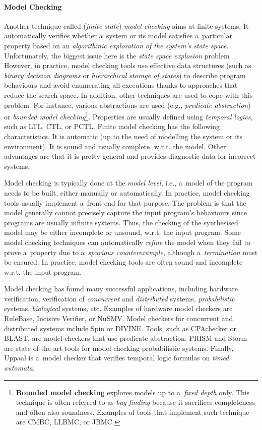 \paragraph{Model Checking}
Another technique called (\emph{finite-state}) \emph{model checking} aims at finite systems. It automatically verifies  whether a~system or its model satisfies a~particular property based on an \emph{algorithmic exploration of the system's state space}. Unfortunately, the biggest issue here is the \emph{state space explosion} problem~\cite{stateExpl}. However, in practice, model checking tools use effective data structures (such as \emph{binary decision diagrams} or \emph{hierarchical storage of states}) to describe program behaviours and avoid enumerating all executions thanks to approaches that reduce the search space. In addition, other techniques are used to cope with this problem. For instance, various abstractions are used (e.g., \emph{predicate abstraction}) or \emph{bounded model checking}\footnote{\textbf{Bounded model checking} explores models up to a~\emph{fixed depth} only. This technique is often referred to as \emph{bug finding} because it sacrifices completeness and often also soundness. Examples of tools that implement such technique are CMBC, LLBMC, or JBMC.}. Properties are usually defined using \emph{temporal logics}, such as LTL, CTL, or PCTL. Finite model checking has the following characteristics. It is automatic (up to the need of modelling the system or its environment). It is sound and usually complete, w.r.t. the model. Other advantages are that it is pretty general and provides diagnostic data for incorrect systems.

Model checking is typically done at the \emph{model level}, i.e., a~model of the program needs to be built, either manually or automatically. In practice, model checking tools usually implement a~front-end for that purpose. The problem is that the model generally cannot precisely capture the input program's behaviours since programs are usually infinite systems. Thus, the checking of the synthesised model may be either incomplete or unsound, w.r.t. the input program. Some model checking techniques can automatically \emph{refine} the model when they fail to prove a~property due to a~\emph{spurious counterexample}, although a~\emph{termination} must be ensured. In practice, model checking tools are often sound and incomplete w.r.t. the input program.

Model checking has found many successful applications, including hardware verification, verification of \emph{concurrent} and \emph{distributed} systems, \emph{probabilistic} systems, \emph{biological} systems, etc. Examples of hardware model checkers are RuleBase, Incisive Verifier, or NuSMV. Model checkers for concurrent and distributed systems include Spin or DIVINE. Tools, such as CPAchecker or BLAST, are model checkers that use predicate abstraction. PRISM and Storm are state-of-the-art tools for model checking probabilistic systems. Finally, Uppaal is a~model checker that verifies temporal logic formulas on \emph{timed automata}.

